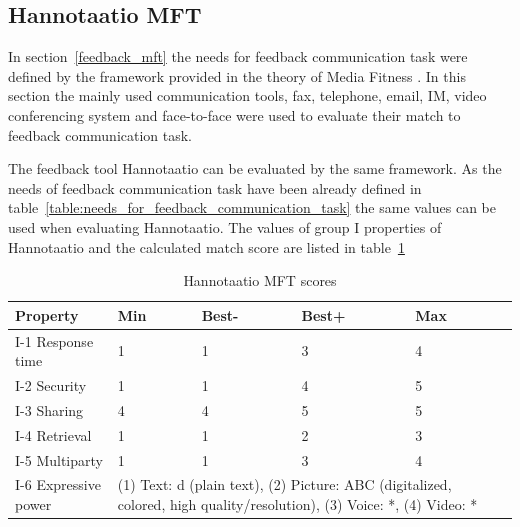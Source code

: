\documentclass[english,12pt,a4paper,pdftex]{article}
\begin{document}

\subsection{Hannotaatio MFT}
\label{sec:hannotaatio_mft}

In section~\ref{feedback_mft} the needs for feedback communication task were defined by the framework provided in the theory of Media Fitness \citep{higa2007}. In this section the mainly used communication tools, fax, telephone, email, \ac{IM}, video conferencing system and face-to-face were used to evaluate their match to feedback communication task.

The feedback tool Hannotaatio can be evaluated by the same framework. As the needs of feedback communication task have been already defined in table~\ref{table:needs_for_feedback_communication_task} the same values can be used when evaluating Hannotaatio. The values of group I properties of Hannotaatio and the calculated match score are listed in table~\ref{table:hannotaatio_mft_scores}

\begin{table}[!h]
\renewcommand{\arraystretch}{1.3}
\caption{Hannotaatio \ac{MFT} scores}
\label{table:hannotaatio_mft_scores}
\centering
\begin{tabular}{|p{3cm}|p{2cm}|p{2cm}|p{2cm}|p{2cm}|p{2cm}|}
\hline
\textbf{Property} & \textbf{Min} & \textbf{Best-} & \textbf{Best+} & \textbf{Max}\\
\hline
I-1 Response time & 1 & 1 & 3 & 4 \\
\hline
I-2 Security & 1 & 1 & 4 & 5 \\
\hline
I-3 Sharing & 4 & 4 & 5 & 5 \\
\hline
I-4 Retrieval & 1 & 1 & 2 & 3 \\
\hline
I-5 Multiparty & 1 & 1 & 3 & 4 \\
\hline
I-6 Expressive power & \multicolumn{4}{|p{10cm}|}{(1) Text: d (plain text), (2) Picture: ABC (digitalized, colored, high quality/resolution), (3) Voice: *, (4) Video: * } \\
\hline
\end{tabular}
\end{table}
\end{document}
